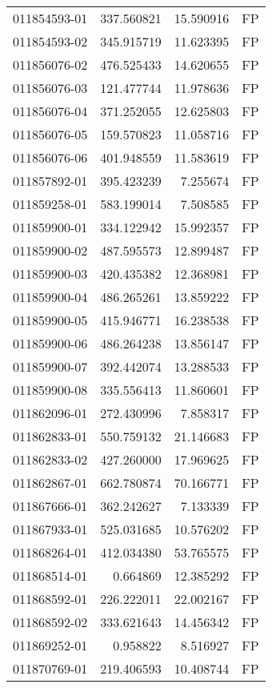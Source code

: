 \begin{tabular}{lrrl}
011854593-01 &  337.560821 &    15.590916 &   FP \\
011854593-02 &  345.915719 &    11.623395 &   FP \\
011856076-02 &  476.525433 &    14.620655 &   FP \\
011856076-03 &  121.477744 &    11.978636 &   FP \\
011856076-04 &  371.252055 &    12.625803 &   FP \\
011856076-05 &  159.570823 &    11.058716 &   FP \\
011856076-06 &  401.948559 &    11.583619 &   FP \\
011857892-01 &  395.423239 &     7.255674 &   FP \\
011859258-01 &  583.199014 &     7.508585 &   FP \\
011859900-01 &  334.122942 &    15.992357 &   FP \\
011859900-02 &  487.595573 &    12.899487 &   FP \\
011859900-03 &  420.435382 &    12.368981 &   FP \\
011859900-04 &  486.265261 &    13.859222 &   FP \\
011859900-05 &  415.946771 &    16.238538 &   FP \\
011859900-06 &  486.264238 &    13.856147 &   FP \\
011859900-07 &  392.442074 &    13.288533 &   FP \\
011859900-08 &  335.556413 &    11.860601 &   FP \\
011862096-01 &  272.430996 &     7.858317 &   FP \\
011862833-01 &  550.759132 &    21.146683 &   FP \\
011862833-02 &  427.260000 &    17.969625 &   FP \\
011862867-01 &  662.780874 &    70.166771 &   FP \\
011867666-01 &  362.242627 &     7.133339 &   FP \\
011867933-01 &  525.031685 &    10.576202 &   FP \\
011868264-01 &  412.034380 &    53.765575 &   FP \\
011868514-01 &    0.664869 &    12.385292 &   FP \\
011868592-01 &  226.222011 &    22.002167 &   FP \\
011868592-02 &  333.621643 &    14.456342 &   FP \\
011869252-01 &    0.958822 &     8.516927 &   FP \\
011870769-01 &  219.406593 &    10.408744 &   FP \\

\end{tabular}
